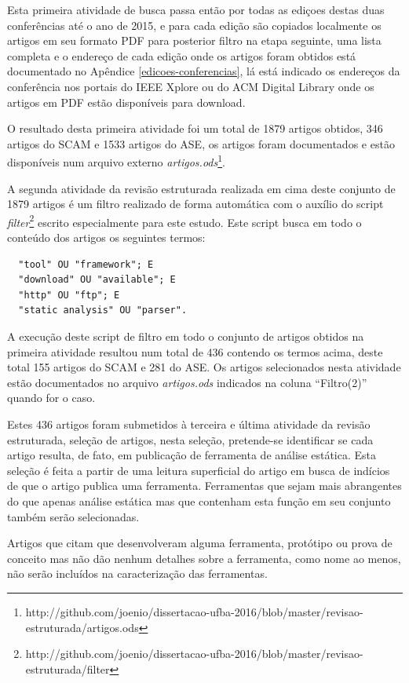 Esta primeira atividade de busca passa então por todas as ediçoes destas duas
conferências até o ano de 2015, e para cada edição são copiados localmente os
artigos em seu formato PDF para posterior filtro na etapa seguinte, uma lista
completa e o endereço de cada edição onde os artigos foram obtidos está
documentado no Apêndice \ref{edicoes-conferencias}, lá está indicado os
endereços da conferência nos portais do IEEE Xplore ou do ACM Digital Library
onde os artigos em PDF estão disponíveis para download.

O resultado desta primeira atividade foi um total de 1879 artigos obtidos, 346
artigos do SCAM e 1533 artigos do ASE, os artigos foram documentados e estão disponíveis num arquivo externo
{\it artigos.ods}\footnote{http://github.com/joenio/dissertacao-ufba-2016/blob/master/revisao-estruturada/artigos.ods}.

A segunda atividade da revisão estruturada realizada em cima deste conjunto de
1879 artigos é um filtro realizado de forma automática com o auxílio do script
{\it
filter}\footnote{http://github.com/joenio/dissertacao-ufba-2016/blob/master/revisao-estruturada/filter}
escrito especialmente para este estudo. Este script busca em todo o conteúdo
dos artigos os seguintes termos:

\begin{verbatim}
  "tool" OU "framework"; E
  "download" OU "available"; E
  "http" OU "ftp"; E
  "static analysis" OU "parser".
\end{verbatim}

A execução deste script de filtro em todo o conjunto de artigos obtidos na
primeira atividade resultou num total de 436 contendo os termos acima, deste
total 155 artigos do SCAM e 281 do ASE. Os artigos selecionados nesta atividade
estão documentados no arquivo {\it artigos.ods} indicados na coluna ``Filtro(2)''
quando for o caso.

Estes 436 artigos foram submetidos à terceira e última atividade da revisão estruturada,
seleção de artigos, nesta seleção, pretende-se identificar se cada artigo
resulta, de fato, em publicação de ferramenta de análise estática. Esta seleção
é feita a partir de uma leitura superficial do artigo em busca de indícios de
que o artigo publica uma ferramenta. Ferramentas que sejam mais abrangentes do
que apenas análise estática mas que contenham esta função em seu conjunto
também serão selecionadas.

Artigos que citam que desenvolveram alguma ferramenta, protótipo ou prova de
conceito mas não dão nenhum detalhes sobre a ferramenta, como nome ao menos,
não serão incluídos na caracterização das ferramentas.

